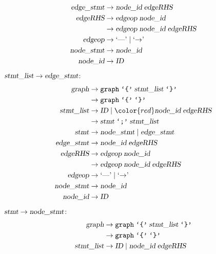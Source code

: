\begin{loesung}
\begin{teilaufgaben}
\begin{align*}
\textsl{edge\_stmt}&\rightarrow \textsl{node\_id}\; \textsl{edgeRHS} \\
\textsl{edgeRHS}   &\rightarrow \textsl{edgeop}\; \textsl{node\_id}\\
                   &\rightarrow \textsl{edgeop}\; \textsl{node\_id}\; \textsl{edgeRHS}\\
\textsl{edgeop}    &\rightarrow \textrm{`\text{---}'}\; |\; \textrm{`$\rightarrow$'}\; \\
\textsl{node\_stmt}&\rightarrow \textsl{node\_id} \\
\textsl{node\_id}  &\rightarrow \textsl{ID}
\end{align*}
$\textsl{stmt\_list}\to\textsl{edge\_stmt}$:
\begin{align*}
\textsl{graph}     &\rightarrow \texttt{graph}\; \texttt{`\{'}\; \textsl{stmt\_list}\; \texttt{`\}'} \\
                   &\rightarrow \texttt{graph}\; \texttt{`\{'}\; \texttt{`\}'} \\
\textsl{stmt\_list}&\rightarrow \textsl{ID}\; |\;
                                {\color{red}\textsl{node\_id}\; \textsl{edgeRHS} }\\
                   &\rightarrow \textsl{stmt}\; \texttt{`;'}\; \textsl{stmt\_list}\\
\textsl{stmt}      &\rightarrow \textsl{node\_stmt}\; |\;
                                \textsl{edge\_stmt} \\
\textsl{edge\_stmt}&\rightarrow \textsl{node\_id}\; \textsl{edgeRHS} \\
\textsl{edgeRHS}   &\rightarrow \textsl{edgeop}\; \textsl{node\_id}\\
                   &\rightarrow \textsl{edgeop}\; \textsl{node\_id}\; \textsl{edgeRHS}\\
\textsl{edgeop}    &\rightarrow \textrm{`\text{---}'}\; |\; \textrm{`$\rightarrow$'}\; \\
\textsl{node\_stmt}&\rightarrow \textsl{node\_id} \\
\textsl{node\_id}  &\rightarrow \textsl{ID}
\end{align*}
$\textsl{stmt}\to\textsl{node\_stmt}$:
\begin{align*}
\textsl{graph}     &\rightarrow \texttt{graph}\; \texttt{`\{'}\; \textsl{stmt\_list}\; \texttt{`\}'} \\
                   &\rightarrow \texttt{graph}\; \texttt{`\{'}\; \texttt{`\}'} \\
\textsl{stmt\_list}&\rightarrow \textsl{ID}\; |\;
                                \textsl{node\_id}\; \textsl{edgeRHS} \\

\end{align*}
\end{teilaufgaben}
\end{loesung}
